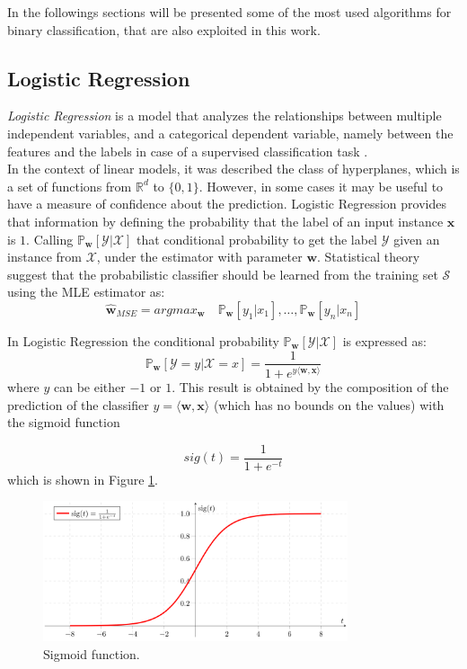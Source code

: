 In the followings sections will be presented some of the most used algorithms for binary classification, that are also exploited in this work.


\subsection{Logistic Regression}

\textit{Logistic Regression} is a model that analyzes the relationships between multiple independent variables, and a categorical dependent variable, namely between the features and the labels in case of a supervised classification task \cite{article-logreg}.\\
In the context of linear models, it was described the class of hyperplanes, which is a set of functions from $\mathbb{R}^d$ to $\{0,1\}$. However, in some cases it may be useful to have a measure of confidence about the prediction. Logistic Regression provides that information by defining the probability that the label of an input instance $\mathbf{x}$ is $1$. Calling $\mathbb{P}_\mathbf{w}[\mathcal{Y} | \mathcal{X}]$ that conditional probability to get the label $\mathcal{Y}$ given an instance from $\mathcal{X}$, under the estimator with parameter $\mathbf{w}$. Statistical theory suggest that the probabilistic classifier should be learned from the training set $\mathcal{S}$ using the MLE estimator as:
\[ \hat{\mathbf{w}}_{MSE} = argmax_\mathbf{w} \quad \mathbb{P}_\mathbf{w}[y_1 | x_1], \dots , \mathbb{P}_\mathbf{w}[y_n | x_n] \]

In Logistic Regression the conditional probability $\mathbb{P}_\mathbf{w}[\mathcal{Y} | \mathcal{X}]$ is expressed as:
\[ \mathbb{P}_\mathbf{w}[\mathcal{Y}=y | \mathcal{X}=x] = \frac{1}{1 + e^{y \langle \mathbf{w}, \mathbf{x} \rangle}} \]
where $y$ can be either $-1$ or $1$. This result is obtained by the composition of the prediction of the classifier $y = \langle \mathbf{w}, \mathbf{x} \rangle$ (which has no bounds on the values) with the sigmoid function

\[ sig(t) = \frac{1}{1 + e^{-t}} \]
which is shown in Figure \ref{fig:sigmoid}.

\begin{figure}[ht]
	\centering
	\includegraphics[width=0.8\textwidth]{figures/sigmoid.png}
	\caption{Sigmoid function.}
	\label{fig:sigmoid}
\end{figure}

